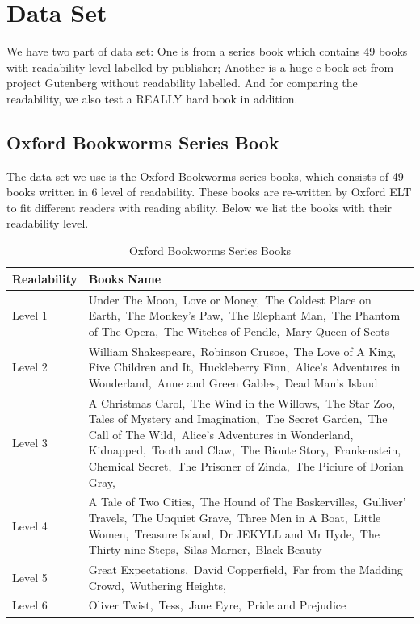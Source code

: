 \documentclass{article}
\begin{document}
\section{Data Set}
We have two part of data set: One is from a series book which contains 49 books with readability level labelled by publisher; Another is a huge e-book set from project Gutenberg without readability labelled.
And for comparing the readability, we also test a REALLY hard book in addition.
\subsection{Oxford Bookworms Series Book}
The data set we use is the Oxford Bookworms series books\cite{oxford}, which consists of 49 books written in 6 level of readability. These books are re-written by Oxford ELT to fit different readers with reading ability. Below we list the books with their readability level.
\begin{table}[H]
{\renewcommand\arraystretch{1.25}
\begin{tabular}{|l|l|l|} \hline
Readability & \multicolumn{2}{l|}{Books Name} \\ \hline\hline
Level 1 & \multicolumn{2}{p{12cm}|}{\raggedright 
Under The Moon,\,
Love or Money,\,
The Coldest Place on Earth,\,
The Monkey's Paw,\,
The Elephant Man,\,
The Phantom of The Opera,\,
The Witches of Pendle,\,
Mary Queen of Scots} \\ \hline
Level 2 & \multicolumn{2}{p{12cm}|}{
William Shakespeare,\,
Robinson Crusoe,\,
The Love of A King,\,
Five Children and It,\,
Huckleberry Finn,\,
Alice's Adventures in Wonderland,\,
Anne and Green Gables,\,
Dead Man's Island
} \\ \hline
Level 3 & \multicolumn{2}{p{12cm}|}{
A Christmas Carol,\,
The Wind in the Willows,\,
The Star Zoo,\,
Tales of Mystery and Imagination,\,
The Secret Garden,\,
The Call of The Wild,\,
Alice's Adventures in Wonderland,\,
Kidnapped,\,
Tooth and Claw,\,
The Bionte Story,\,
Frankenstein,\,
Chemical Secret,\,
The Prisoner of Zinda,\,
The Piciure of Dorian Gray,\,
} \\ \hline
Level 4 & \multicolumn{2}{p{12cm}|}{
A Tale of Two Cities,\,
The Hound of The Baskervilles,\,
Gulliver' Travels,\,
The Unquiet Grave,\,
Three Men in A Boat,\,
Little Women,\,
Treasure Island,\,
Dr JEKYLL and Mr Hyde,\,
The Thirty-nine Steps,\,
Silas Marner,\,
Black Beauty
} \\ \hline
Level 5 & \multicolumn{2}{p{12cm}|}{
Great Expectations,\,
David Copperfield,\,
Far from the Madding Crowd,\,
Wuthering Heights,\,

} \\ \hline
Level 6 & \multicolumn{2}{p{12cm}|}{
Oliver Twist,\,
Tess,\,
Jane Eyre,\,
Pride and Prejudice

} \\ \hline
\end{tabular}}
\caption{Oxford Bookworms Series Books} \label{tab: testtime}
\end{table}
\end{document}
